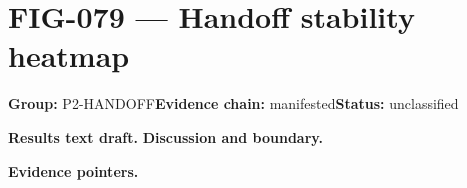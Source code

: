 \clearpage
\section{FIG-079 --- Handoff stability heatmap}
\label{figpage:fig-079}
\textbf{Group:} P2-HANDOFF\quad \textbf{Evidence chain:} manifested\quad \textbf{Status:} unclassified

\textbf{Results text draft.} 
\textbf{Discussion and boundary.} 


\textbf{Evidence pointers.}



\vfill
